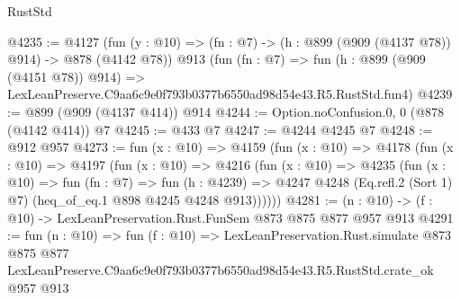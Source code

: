 \begin{lexlean}{RustStd}
\begin{coremodule}
@4235 := @4127
    (fun (y : @10) => (fn : @7) -> (h : @899 (@909 (@4137 @78)) @914) -> @878 (@4142 @78))
    @913
    (fun (fn : @7) =>
    fun (h : @899 (@909 (@4151 @78)) @914) =>
    LexLeanPreserve.C9aa6c9e0f793b0377b6550ad98d54e43.R5.RustStd.fun4)
@4239 := @899 (@909 (@4137 @414)) @914
@4244 := Option.noConfusion.{0, 0} (@878 (@4142 @414)) @7
@4245 := @433 @7
@4247 := @4244 @4245 @7
@4248 := @912 @957
@4273 := fun (x : @10) =>
  @4159
    (fun (x : @10) =>
    @4178
      (fun (x : @10) =>
      @4197
        (fun (x : @10) =>
        @4216
          (fun (x : @10) =>
          @4235
            (fun (x : @10) =>
            fun (fn : @7) =>
            fun (h : @4239) =>
            @4247 @4248 (Eq.refl.{2} (Sort 1) @7) (heq_of_eq.{1} @898 @4245 @4248 @913))))))
@4281 := (n : @10) -> (f : @10) -> LexLeanPreservation.Rust.FunSem @873 @875 @877 @957 @913
@4291 := fun (n : @10) =>
  fun (f : @10) =>
  LexLeanPreservation.Rust.simulate
    @873
    @875
    @877
    LexLeanPreserve.C9aa6c9e0f793b0377b6550ad98d54e43.R5.RustStd.crate_ok
    @957
    @913
\end{coremodule}
\end{lexlean}
